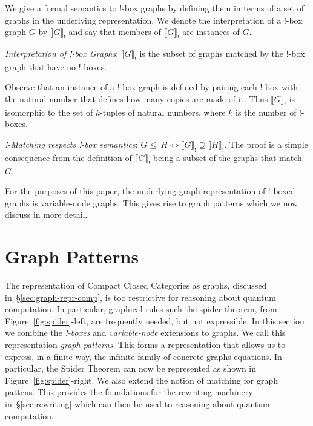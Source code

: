 \documentclass[runningheads]{llncs}
\newcommand{\binterp}[1]{\llbracket #1 \rrbracket_!}
\begin{document}
We give a formal semantics to !-box graphs by defining them in terms
of a set of graphs in the underlying representation. We denote the
interpretation of a !-box graph $G$ by $\binterp{G}$ and say that
members of $\binterp{G}$ are instances of $G$.

\begin{definition}
  \emph{Interpretation of !-box Graphs}: $\binterp{G}$ is the subset
  of graphs matched by the !-box graph that have no !-boxes.
\end{definition}

Observe that an instance of a !-box graph is defined by pairing each
!-box with the natural number that defines how many copies are made of
it. Thus $\binterp{G}$ is isomorphic to the set of $k$-tuples of
natural numbers, where $k$ is the number of !-boxes.

\begin{theorem}
\label{thm:bang-box-respect}
\emph{!-Matching respects !-box semantics}: $G \leq_! H
\Leftrightarrow \binterp{G} \supseteq \binterp{H}$. The proof is a
simple consequence from the definition of $\binterp{G}$ being a subset
of the graphs that match $G$.
\end{theorem}

For the purposes of this paper, the underlying graph representation of
!-boxed graphs is variable-node graphs. This gives rise to graph
patterns which we now discuss in more detail.

\section{Graph Patterns}
\label{sec:patterns}

The representation of Compact Closed Categories as graphs, discussed
in~\S\ref{sec:graph-repr-comp}, is too restrictive for reasoning about
quantum computation. In particular, graphical rules such the spider
theorem, from Figure~\ref{fig:spider}-left, are frequently needed, but
not expressible. In this section we combine the {\em !-boxes} and {\em
  variable-node} extensions to graphs. We call this representation
\emph{graph patterns}. This forms a representation that allows us to
express, in a finite way, the infinite family of concrete graphs
equations. In particular, the Spider Theorem can now be represented as
shown in Figure~\ref{fig:spider}-right. We also extend the notion of
matching for graph pattens.
This provides the foundations for the rewriting machinery
in~\S\ref{sec:rewriting} which can then be used to reasoning about
quantum computation.
\end{document}
